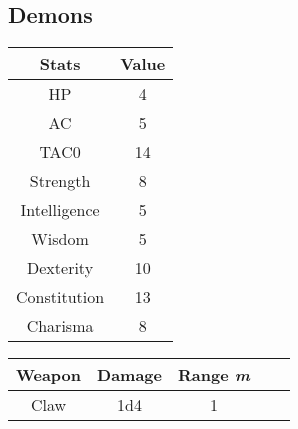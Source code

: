 \subsection{Demons}
\begin{table}[H]
  \centering
  \begin{tabular}{|c|c|}
    \hline
    \rowcolor[HTML]{C0C0C0}
    \textbf{Stats} & \textbf{Value} \\ \hline
    HP & 4 \\ \hline
    AC & 5 \\ \hline
    TAC0 & 14 \\ \hline
    Strength & 8 \\ \hline
    Intelligence & 5 \\ \hline
    Wisdom & 5  \\ \hline
    Dexterity & 10 \\ \hline
    Constitution & 13 \\ \hline
    Charisma & 8 \\ \hline
  \end{tabular}
\end{table}
\begin{table}[H]
  \centering
  \begin{tabular}{lll|c|c|}
    \hline
    \rowcolor[HTML]{C0C0C0}
    \textbf{Weapon} & \textbf{Damage} & \textbf{Range \textit{m}} \\ \hline
    \multicolumn{1}{|c|}{Claw} & \multicolumn{1}{c|}{1d4} & \multicolumn{1}{c|}{1} \\ \hline
  \end{tabular}
\end{table}

